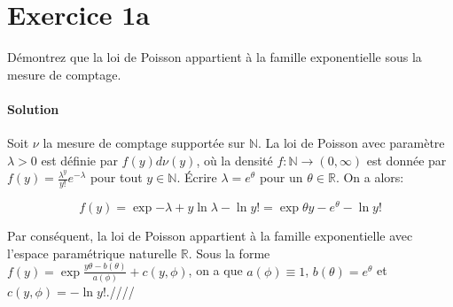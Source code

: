 \documentclass[../main.tex]{subfiles}
\begin{document}
\section*{Exercice 1a}
\begin{CJK*}{UTF8}{gbsn}
Démontrez que la loi de Poisson appartient à la famille exponentielle sous la mesure de comptage.

\smallskip
\paragraph{Solution}
Soit $\nu$ la mesure de comptage supportée sur $\mathbb{N}$.
La loi de Poisson avec paramètre $\lambda > 0$ est définie par $f(y)d\nu(y)$, 
où la densité $f: \mathbb{N} \to (0, \infty)$ est donnée par $f(y) = \frac{\lambda^y}{y!}e^{-\lambda}$
pour tout $y \in \mathbb{N}$. Écrire $\lambda = e^{\theta}$ pour un $\theta \in \mathbb{R}$. On a alors:

\begin{equation*}
    f(y) = \exp{- \lambda + y \ln {\lambda} - \ln {y!}} = \exp{\theta y - e^{\theta} - \ln {y!}}
\end{equation*}

Par conséquent, la loi de Poisson appartient à la famille exponentielle avec l'espace paramétrique naturelle $\mathbb{R}$.
Sous la forme $f(y) = \exp{\frac{y \theta - b(\theta)}{a(\phi)} + c(y, \phi)}$, 
on a que $a(\phi) \equiv 1$, $b(\theta) = e^{\theta}$ et $c(y, \phi) = - \ln {y!}$.////

\end{CJK*}
\end{document}
